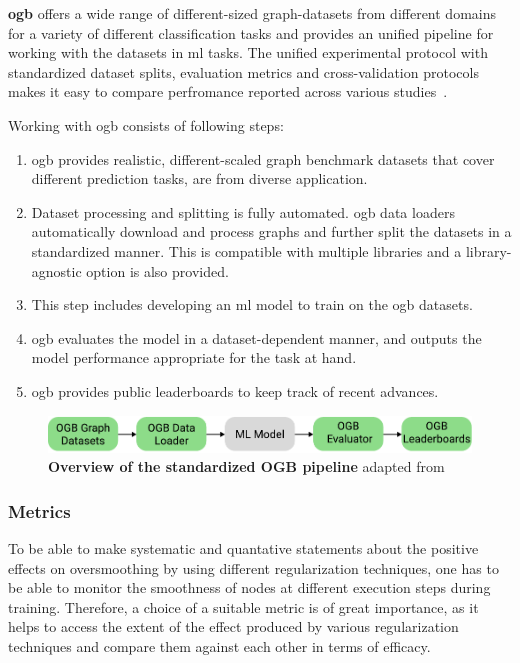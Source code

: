 \textbf{\Ac{ogb}} offers a wide range of different-sized graph-datasets from different domains for a variety of different classification tasks and provides an unified pipeline for working with the datasets in \ac{ml} tasks.
The unified experimental protocol with standardized dataset splits, evaluation metrics and cross-validation protocols makes it easy to compare perfromance reported across various studies~\cite{Hu2020}.

Working with \ac{ogb} consists of following steps:

\begin{enumerate}
    \item \Ac{ogb} provides realistic, different-scaled graph benchmark datasets that cover different prediction tasks, are from diverse application.
    \item Dataset processing and splitting is fully automated. \Ac{ogb} data loaders automatically download and process graphs and further split the datasets in a standardized manner. This is compatible with multiple libraries and a library-agnostic option is also provided.
    \item This step includes developing an \ac{ml} model to train on the ogb datasets.
    \item  \Ac{ogb} evaluates the model in a dataset-dependent manner, and outputs the model performance appropriate for the task at hand.
    \item \Ac{ogb} provides public leaderboards to keep track of recent advances.
\end{enumerate}

\begin{figure}[H]
    \centering
    \includegraphics[width= 0.90\linewidth]{gfx/implementation/OGB_pipeline}
    \caption{\textbf{Overview of the standardized OGB pipeline} adapted from \cite{Hu2020}}\label{fig:implement:pipeline}
\end{figure}


\subsubsection{Metrics}
\label{sec:implement:setup:choice:metrics}
To be able to make systematic and quantative statements about the positive effects on oversmoothing by using different regularization techniques, one has to be able to monitor the smoothness of nodes at different execution steps during training. Therefore, a choice of a suitable metric is of great importance, as it helps to access the extent of the effect produced by various regularization techniques and compare them against each other in terms of efficacy.

